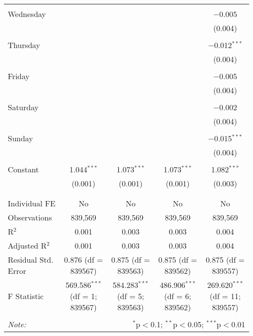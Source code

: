 \documentclass[
]{article}
\begin{document}
\begin{table}[!htbp]
{\begin{tabular}{@{\extracolsep{5pt}}lcccc}
  & & & & \\ 
 Wednesday &  &  &  & $-$0.005 \\ 
  &  &  &  & (0.004) \\ 
  & & & & \\ 
 Thursday &  &  &  & $-$0.012$^{***}$ \\ 
  &  &  &  & (0.004) \\ 
  & & & & \\ 
 Friday &  &  &  & $-$0.005 \\ 
  &  &  &  & (0.004) \\ 
  & & & & \\ 
 Saturday &  &  &  & $-$0.002 \\ 
  &  &  &  & (0.004) \\ 
  & & & & \\ 
 Sunday &  &  &  & $-$0.015$^{***}$ \\ 
  &  &  &  & (0.004) \\ 
  & & & & \\ 
 Constant & 1.044$^{***}$ & 1.073$^{***}$ & 1.073$^{***}$ & 1.082$^{***}$ \\ 
  & (0.001) & (0.001) & (0.001) & (0.003) \\ 
  & & & & \\ 
\hline \\[-1.8ex] 
Individual FE & No & No & No & No \\ 
Observations & 839,569 & 839,569 & 839,569 & 839,569 \\ 
R$^{2}$ & 0.001 & 0.003 & 0.003 & 0.004 \\ 
Adjusted R$^{2}$ & 0.001 & 0.003 & 0.003 & 0.004 \\ 
Residual Std. Error & 0.876 (df = 839567) & 0.875 (df = 839563) & 0.875 (df = 839562) & 0.875 (df = 839557) \\ 
F Statistic & 569.586$^{***}$ (df = 1; 839567) & 584.283$^{***}$ (df = 5; 839563) & 486.906$^{***}$ (df = 6; 839562) & 269.620$^{***}$ (df = 11; 839557) \\ 
\hline 
\hline \\[-1.8ex] 
\textit{Note:}  & \multicolumn{4}{r}{$^{*}$p$<$0.1; $^{**}$p$<$0.05; $^{***}$p$<$0.01} \\ 
\end{tabular}
} 
\end{table} 
\newpage
\end{document}
